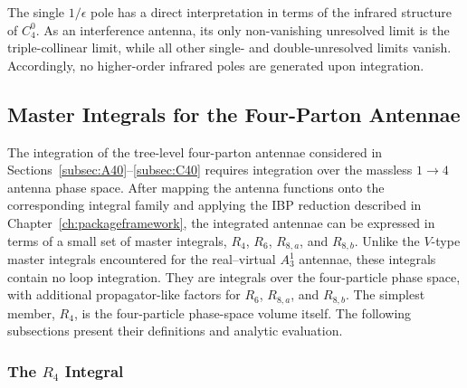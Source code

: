The single $1/\epsilon$ pole has a direct interpretation in terms of the infrared structure of
$C_4^0$. As an interference antenna, its only non-vanishing unresolved limit is the
triple-collinear limit, while all other single- and double-unresolved limits vanish.
Accordingly, no higher-order infrared poles are generated upon integration.

\subsection{Master Integrals for the Four-Parton Antennae}\label{subsec:fourPartonMI}

The integration of the tree-level four-parton antennae considered in
Sections~\ref{subsec:A40}--\ref{subsec:C40} requires integration over the massless $1\to4$
antenna phase space. After mapping the antenna functions onto the corresponding integral family
and applying the IBP reduction described in Chapter~\ref{ch:packageframework}, the integrated
antennae can be expressed in terms of a small set of master integrals, $R_4$, $R_6$,
$R_{8,a}$, and $R_{8,b}$. Unlike the $V$-type master integrals encountered for the
real--virtual $A_3^1$ antennae, these integrals contain no loop integration. They are integrals
over the four-particle phase space, with additional propagator-like factors for $R_6$,
$R_{8,a}$, and $R_{8,b}$. The simplest member, $R_4$, is the four-particle phase-space volume
itself. The following subsections present their definitions and analytic evaluation.

\subsubsection*{The $R_4$ Integral}

